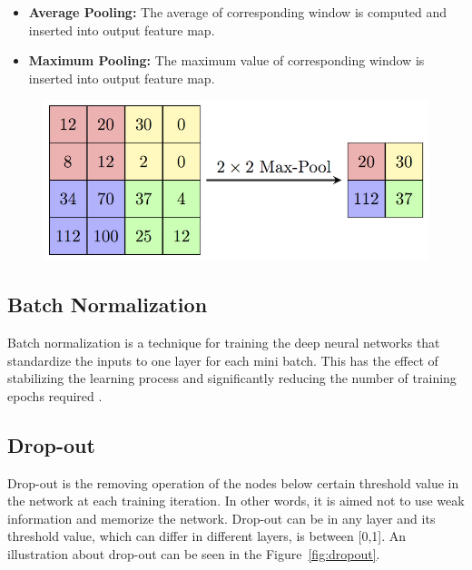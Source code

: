 \begin{itemize}
    \item \textbf{Average Pooling:}  The average of corresponding window is computed and inserted into output feature map.
    \item \textbf{Maximum Pooling:}  The maximum value of corresponding window is inserted into output feature map.
\end{itemize}

\begin{figure}[h]
    \centering
    \includegraphics[width=.8\linewidth]{fig/MaxpoolSample.png}
    \label{fig:maxpooling}
\end{figure}

\subsection{Batch Normalization}

Batch normalization is a technique for training the deep neural networks that standardize the inputs to one layer for each mini batch. This has the effect of stabilizing the learning process and significantly reducing the number of training epochs required \cite{A_novelCNNModel}.

\subsection{Drop-out}

Drop-out is the removing operation of the nodes below certain threshold value in the network at each training iteration. In other words, it is aimed not to use weak information and memorize the network. Drop-out can be in any layer and its threshold value, which can differ in different layers,  is between [0,1]. An illustration about drop-out can be seen in the Figure~\ref{fig:dropout}.

